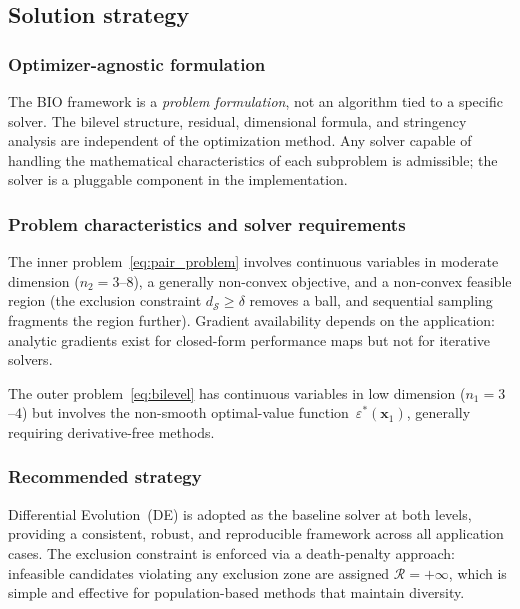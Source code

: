 \subsection{Solution strategy}
\label{sec:solution_strategy}

\subsubsection{Optimizer-agnostic formulation}

The BIO framework is a \emph{problem formulation}, not an algorithm tied to a specific solver. The bilevel structure, residual, dimensional formula, and stringency analysis are independent of the optimization method. Any solver capable of handling the mathematical characteristics of each subproblem is admissible; the solver is a pluggable component in the implementation.

\subsubsection{Problem characteristics and solver requirements}
\label{sec:solver_requirements}

The inner problem~\eqref{eq:pair_problem} involves continuous variables in moderate dimension ($n_2 = 3$--$8$), a generally non-convex objective, and a non-convex feasible region (the exclusion constraint $d_{\mathcal{S}} \geq \delta$ removes a ball, and sequential sampling fragments the region further). Gradient availability depends on the application: analytic gradients exist for closed-form performance maps but not for iterative solvers.

The outer problem~\eqref{eq:bilevel} has continuous variables in low dimension ($n_1 = 3$--$4$) but involves the non-smooth optimal-value function~$\varepsilon^*(\mathbf{x}_1)$, generally requiring derivative-free methods.

\subsubsection{Recommended strategy}

Differential Evolution~(DE) is adopted as the baseline solver at both levels, providing a consistent, robust, and reproducible framework across all application cases. The exclusion constraint is enforced via a death-penalty approach: infeasible candidates violating any exclusion zone are assigned $\mathcal{R} = +\infty$, which is simple and effective for population-based methods that maintain diversity.

